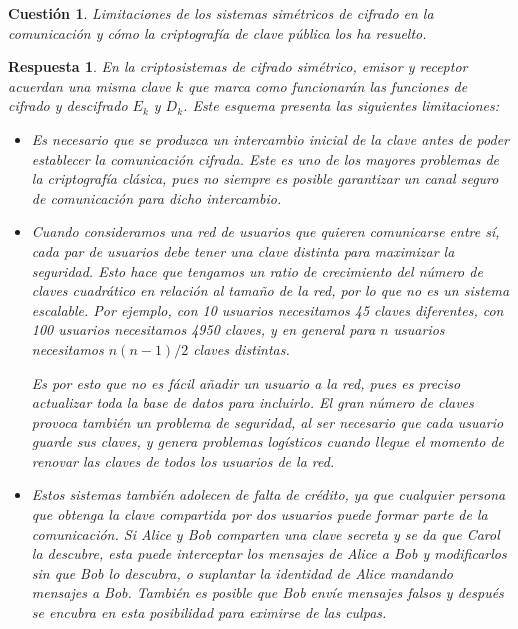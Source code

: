 \documentclass[
  a4paper,
  spanish,
  12pt,
]{scrartcl}
\theoremstyle{ejercicio-style}
\newtheorem{ejer}{Cuestión}
\theoremstyle{remark-style}
\newtheorem*{sol}{Respuesta}
\theoremstyle{teorema-style}
\begin{document}
\begin{ejer}
  Limitaciones de los sistemas simétricos de cifrado en la comunicación y cómo la criptografía de clave pública los ha resuelto.
\end{ejer}

\begin{sol}
  En la criptosistemas de cifrado simétrico, emisor y receptor acuerdan una misma clave $k$ que marca como funcionarán las funciones de cifrado y descifrado $E_k$ y $D_k$. Este esquema presenta las siguientes limitaciones:

\begin{itemize}
\item Es necesario que se produzca un intercambio inicial de la clave antes de poder establecer la comunicación cifrada. Este es uno de los mayores problemas de la criptografía clásica, pues no siempre es posible garantizar un canal seguro de comunicación para dicho intercambio.

\item Cuando consideramos una red de usuarios que quieren comunicarse entre sí, cada par de usuarios debe tener una clave distinta para maximizar la seguridad. Esto hace que tengamos un ratio de crecimiento del número de claves cuadrático en relación al tamaño de la red, por lo que no es un sistema escalable. Por ejemplo, con 10 usuarios necesitamos 45 claves diferentes, con 100 usuarios necesitamos 4950 claves, y en general para $n$ usuarios necesitamos $n(n-1)/2$ claves distintas.

Es por esto que no es fácil añadir un usuario a la red, pues es preciso actualizar toda la base de datos para incluirlo. El gran número de claves provoca también un problema de seguridad, al ser necesario que cada usuario guarde sus claves, y genera problemas logísticos cuando llegue el momento de renovar las claves de todos los usuarios de la red.

\item Estos sistemas también adolecen de falta de crédito, ya que cualquier persona que obtenga la clave compartida por dos usuarios puede formar parte de la comunicación. Si Alice y Bob comparten una clave secreta y se da que Carol la descubre, esta puede interceptar los mensajes de Alice a Bob y modificarlos sin que Bob lo descubra, o suplantar la identidad de Alice mandando mensajes a Bob. También es posible que Bob envíe mensajes falsos y después se encubra en esta posibilidad para eximirse de las culpas.
\end{itemize}


\end{sol}
\end{document}
